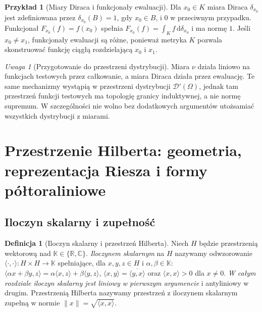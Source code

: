 \documentclass[11pt,a4paper]{article}
\numberwithin{equation}{section}
\theoremstyle{plain}
\theoremstyle{definition}
\newtheorem{definicja}[twierdzenie]{Definicja}
\newtheorem{przyklad}[twierdzenie]{Przykład}
\theoremstyle{remark}
\newtheorem{uwaga}[twierdzenie]{Uwaga}
\newcommand{\R}{\mathbb R}
\newcommand{\C}{\mathbb C}
\newcommand{\K}{\mathbb K}
\begin{document}
\begin{przyklad}[Miary Diraca i funkcjonały ewaluacji]
\label{ex:dirac12}
Dla $x_0\in K$ miara Diraca $\delta_{x_0}$ jest zdefiniowana
przez $\delta_{x_0}(B)=1$, gdy $x_0\in B$, i $0$ w przeciwnym
przypadku. Funkcjonał $F_{x_0}(f)=f(x_0)$ spełnia
$F_{x_0}(f)=\int_Kf\,\mathrm d\delta_{x_0}$ i ma normę $1$.
Jeśli $x_0\ne x_1$, funkcjonały ewaluacji są różne,
ponieważ metryka $K$ pozwala skonstruować funkcję ciągłą
rozdzielającą $x_0$ i $x_1$.
\end{przyklad}

\begin{uwaga}[Przygotowanie do przestrzeni dystrybucji]
\label{rem:bridge-distribution12}
Miara $\nu$ działa liniowo na funkcjach testowych przez całkowanie,
a miara Diraca działa przez ewaluację. Te same mechanizmy wystąpią
w przestrzeni dystrybucji $\mathcal D'(\Omega)$, jednak tam
przestrzeń funkcji testowych ma topologię granicy induktywnej,
a nie normę supremum. W szczególności nie wolno bez dodatkowych
argumentów utożsamiać wszystkich dystrybucji z miarami.
\end{uwaga}


\setcounter{section}{12}
\section{Przestrzenie Hilberta: geometria, reprezentacja Riesza i formy półtoraliniowe}
\label{sec:hilbert13}

\subsection{Iloczyn skalarny i zupełność}

\begin{definicja}[Iloczyn skalarny i przestrzeń Hilberta]
\label{def:iloczyn-skalarny13}
Niech $H$ będzie przestrzenią wektorową nad $\K\in\{\R,\C\}$.
\emph{Iloczynem skalarnym} na $H$ nazywamy odwzorowanie
$\langle\cdot,\cdot\rangle:H\times H\to\K$ spełniające, dla
$x,y,z\in H$ i $\alpha,\beta\in\K$:
$\langle\alpha x+\beta y,z\rangle=\alpha\langle x,z\rangle+
\beta\langle y,z\rangle$,
$\langle x,y\rangle=\overline{\langle y,x\rangle}$ oraz
$\langle x,x\rangle>0$ dla $x\ne0$.
\emph{W całym rozdziale iloczyn skalarny jest liniowy w pierwszym
argumencie} i antyliniowy w drugim. Przestrzenią Hilberta nazywamy
przestrzeń z iloczynem skalarnym zupełną w normie
$\|x\|=\sqrt{\langle x,x\rangle}$.
\end{definicja}
\end{document}
